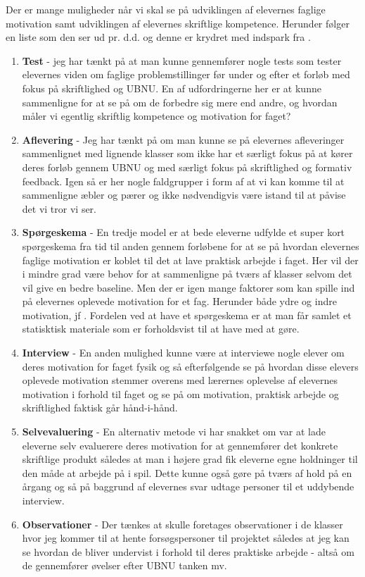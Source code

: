 Der er mange muligheder når vi skal se på udviklingen af elevernes faglige motivation samt udviklingen af elevernes skriftlige kompetence. Herunder følger en liste som den ser ud pr. d.d. og denne er krydret med indspark fra \citet{Brinkmann2015}.
\begin{enumerate}
	 \item {\bfseries \color{red}Test} - jeg har tænkt på at man kunne gennemfører nogle tests som tester elevernes viden om faglige problemstillinger før under og efter et forløb med fokus på skriftlighed og UBNU. En af udfordringerne her er at kunne sammenligne for at se på om de forbedre sig mere end andre, og hvordan måler vi egentlig skriftlig kompetence og motivation for faget?
	 \item {\bfseries \color{red}Aflevering} - Jeg har tænkt på om man kunne se på elevernes afleveringer sammenlignet med lignende klasser som ikke har et særligt fokus på at kører deres forløb gennem UBNU og med særligt fokus på skriftlighed og formativ feedback. Igen så er her nogle faldgrupper i form af at vi kan komme til at sammenligne æbler og pærer og ikke nødvendigvis være istand til at påvise det vi tror vi ser. 
	 \item {\bfseries \color{red} Spørgeskema} - En tredje model er at bede eleverne udfylde et super kort spørgeskema fra tid til anden gennem forløbene for at se på hvordan elevernes faglige motivation er koblet til det at lave praktisk arbejde i faget. Her vil der i  mindre grad være behov for at sammenligne på tværs af klasser selvom det vil give en bedre baseline. Men der er igen mange faktorer som kan spille ind på elevernes oplevede motivation for et fag. Herunder både ydre og indre motivation, jf \citet{Buhl2010}. Fordelen ved at have et spørgeskema er at man får samlet et statisktisk materiale som er forholdsvist til at have med at gøre.
	\item {\bfseries \color{red} Interview} - En anden mulighed kunne være at interviewe nogle elever om deres motivation for faget fysik og så efterfølgende se på hvordan disse elevers oplevede motivation stemmer overens med lærernes oplevelse af elevernes motivation i forhold til faget og se på om motivation, praktisk arbejde og skriftlighed faktisk går hånd-i-hånd.
	\item {\bfseries \color{red} Selvevaluering} - En alternativ metode vi har snakket om var at lade eleverne selv evaluerere deres motivation for at gennemfører det konkrete skriftlige produkt således at man i højere grad fik eleverne egne holdninger til den måde at arbejde på i spil. Dette kunne også gøre på tværs af hold på en årgang og så på baggrund af elevernes svar udtage personer til et uddybende interview.
	\item {\bfseries \color{red} Observationer} - Der tænkes at skulle foretages observationer i de klasser hvor jeg kommer til at hente forsøgspersoner til projektet således at jeg kan se hvordan de bliver undervist i forhold til deres praktiske arbejde - altså om de gennemfører øvelser efter UBNU tanken mv.
\end{enumerate}